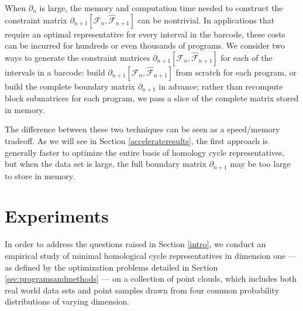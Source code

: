 \documentclass[utf8]{formatting_stuff/frontiersFPHY}
\newcommand{\se}{Section }
\theoremstyle{plain}
\theoremstyle{definition}
\begin{document}
When $\partial_n$ is large, the memory and computation time needed to construct the constraint matrix $\partial_{n+1}[\mathcal{F}_n, \hat {\mathcal{F}}_{n+1} ]$ can be nontrivial.  In applications that require an optimal representative for every interval in the barcode, these costs can be incurred for hundreds or even thousands of programs. We consider two ways to generate the constraint matrices $\partial_{n+1}[\mathcal{F}_n, \hat {\mathcal{F}}_{n+1} ]$ for each of the intervals in a barcode: build $\partial_{n+1}[\mathcal{F}_n, \hat {\mathcal{F}}_{n+1} ]$ from scratch for each program, or build the complete boundary matrix $\partial_{n+1}$ in advance; rather than recompute block submatrices for each program, we pass a slice of the complete matrix stored in memory.  

The difference between these two techniques can be seen as a speed/memory tradeoff.  As we will see in \se \ref{accelerateresults}, the first approach is generally faster to optimize the entire basis of homology cycle representatives, but when the data set is large, the full boundary matrix $\partial_{n+1}$ may be too large to store in memory. 


\section{Experiments}\label{methods}


In order to address the questions raised in \se \ref{intro}, we conduct an empirical study of minimal homological cycle representatives in dimension one --- as defined by the optimization problems detailed in Section \ref{sec:programsandmethods} --- on a collection of point clouds, which includes both real world data sets and point samples drawn from four common probability distributions of varying dimension.  
\newcommand{\sample}{\mathbf{S}}
\end{document}
